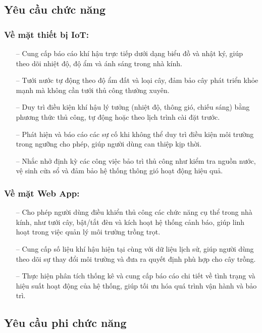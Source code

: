 \subsection{Yêu cầu chức năng}

\subsubsection{Về mặt thiết bị IoT:}
\begin{itemize}
    \item [--] Cung cấp báo cáo khí hậu trực tiếp dưới dạng biểu đồ và nhật ký, giúp theo dõi nhiệt độ, độ ẩm và ánh sáng trong nhà kính.  
    \item [--] Tưới nước tự động theo độ ẩm đất và loại cây, đảm bảo cây phát triển khỏe mạnh mà không cần tưới thủ công thường xuyên.  
    \item [--] Duy trì điều kiện khí hậu lý tưởng (nhiệt độ, thông gió, chiếu sáng) bằng phương thức thủ công, tự động hoặc theo lịch trình cài đặt trước.  
    \item [--] Phát hiện và báo cáo các sự cố khi không thể duy trì điều kiện môi trường trong ngưỡng cho phép, giúp người dùng can thiệp kịp thời.  
    \item [--] Nhắc nhở định kỳ các công việc bảo trì thủ công như kiểm tra nguồn nước, vệ sinh cửa sổ và đảm bảo hệ thống thông gió hoạt động hiệu quả.
\end{itemize}

\subsubsection{Về mặt Web App:}
\begin{itemize}
     \item [--] Cho phép người dùng điều khiển thủ công các chức năng cụ thể trong nhà kính, như tưới cây, bật/tắt đèn và kích hoạt hệ thống cảnh báo, giúp linh hoạt trong việc quản lý môi trường trồng trọt.
     \item [--] Cung cấp số liệu khí hậu hiện tại cùng với dữ liệu lịch sử, giúp người dùng theo dõi sự thay đổi môi trường và đưa ra quyết định phù hợp cho cây trồng.
     \item [--] Thực hiện phân tích thống kê và cung cấp báo cáo chi tiết về tình trạng và hiệu suất hoạt động của hệ thống, giúp tối ưu hóa quá trình vận hành và bảo trì. 
\end{itemize}

\subsection{Yêu cầu phi chức năng}

